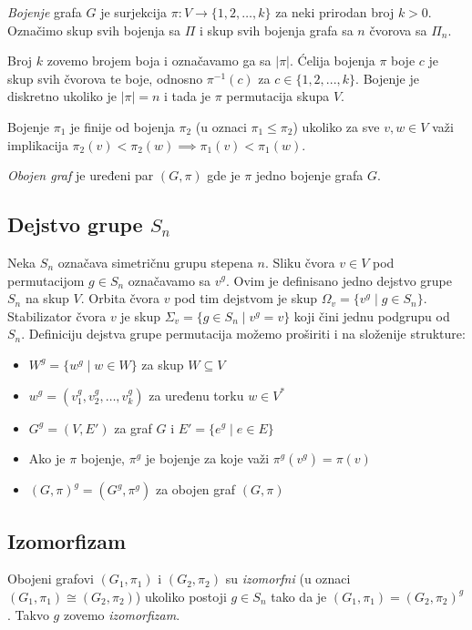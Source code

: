 \documentclass[12pt,oneside]{memoir}
\begin{document}
  \emph{Bojenje} grafa $G$ je surjekcija $\pi : V \to \{1, 2, \dots, k\}$ za
  neki prirodan broj $k > 0$. Označimo skup svih bojenja sa $\Pi$ i skup svih
  bojenja grafa sa $n$ čvorova sa $\Pi_n$.

  Broj $k$ zovemo brojem boja i označavamo ga sa $|\pi|$.  Ćelija bojenja $\pi$
  boje $c$ je skup svih čvorova te boje, odnosno $\pi^{-1}(c)$ za $c \in \{1,
  2, ..., k\}$.  Bojenje je diskretno ukoliko je $|\pi| = n$ i tada je $\pi$
  permutacija skupa $V$.

  Bojenje $\pi_1$ je finije od bojenja $\pi_2$ (u oznaci $\pi_1 \leq \pi_2$)
  ukoliko za sve $v, w \in V$ važi implikacija $\pi_2(v) < \pi_2(w) \implies
  \pi_1(v) < \pi_1(w)$.

  \emph{Obojen graf} je uređeni par $(G, \pi)$ gde je $\pi$ jedno bojenje
  grafa $G$.


  \subsection{Dejstvo grupe $S_n$}

  Neka $S_n$ označava simetričnu grupu stepena $n$. Sliku čvora $v \in V$ pod
  permutacijom $g \in S_n$ označavamo sa $v^g$. Ovim je definisano jedno
  dejstvo grupe $S_n$ na skup $V$. Orbita čvora $v$ pod tim dejstvom je skup
  $\Omega_v = \{ v^g \mid g \in S_n \}$. Stabilizator čvora $v$ je skup
  $\Sigma_v = \{ g \in S_n \mid v^g = v \}$ koji čini jednu podgrupu od $S_n$.
  Definiciju dejstva grupe permutacija možemo proširiti i na složenije
  strukture:
  \begin{itemize}
	  \item $W^g = \{w^g \mid w \in W\}$ za skup $W \subseteq V$
	  \item $w^g = (v_1^g, v_2^g, \dots, v_k^g)$ za uređenu torku $w \in V^*$
	  \item $G^g = (V, E')$ za graf $G$ i $E' = \{e^g \mid e \in E\}$
	  \item Ako je $\pi$ bojenje, $\pi^g$ je bojenje za koje važi
		  $\pi^g(v^g)=\pi(v)$
	  \item $(G, \pi)^g = (G^g, \pi^g)$ za obojen graf $(G, \pi)$
  \end{itemize}


  \subsection{Izomorfizam}

  Obojeni grafovi $(G_1, \pi_1)$ i $(G_2, \pi_2)$ su \emph{izomorfni} (u oznaci
  $(G_1, \pi_1) \cong (G_2, \pi_2)$) ukoliko postoji $g \in S_n$ tako da je
  $(G_1, \pi_1) = (G_2, \pi_2)^g$. Takvo $g$ zovemo \emph{izomorfizam}.
\end{document}
